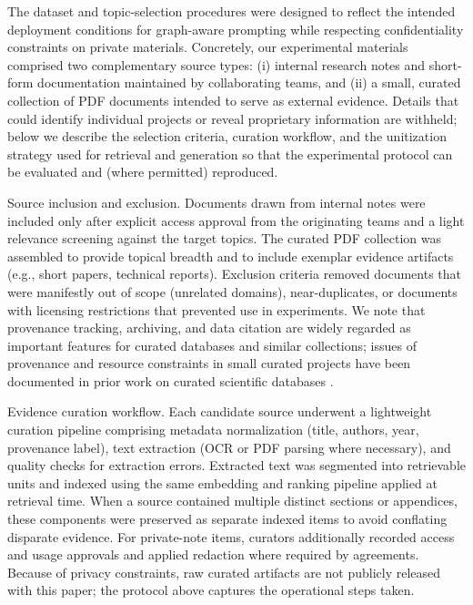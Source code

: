 The dataset and topic-selection procedures were designed to reflect the intended deployment conditions for graph-aware prompting while respecting confidentiality constraints on private materials. Concretely, our experimental materials comprised two complementary source types: (i) internal research notes and short-form documentation maintained by collaborating teams, and (ii) a small, curated collection of PDF documents intended to serve as external evidence. Details that could identify individual projects or reveal proprietary information are withheld; below we describe the selection criteria, curation workflow, and the unitization strategy used for retrieval and generation so that the experimental protocol can be evaluated and (where permitted) reproduced.

Source inclusion and exclusion. Documents drawn from internal notes were included only after explicit access approval from the originating teams and a light relevance screening against the target topics. The curated PDF collection was assembled to provide topical breadth and to include exemplar evidence artifacts (e.g., short papers, technical reports). Exclusion criteria removed documents that were manifestly out of scope (unrelated domains), near-duplicates, or documents with licensing restrictions that prevented use in experiments. We note that provenance tracking, archiving, and data citation are widely regarded as important features for curated databases and similar collections; issues of provenance and resource constraints in small curated projects have been documented in prior work on curated scientific databases \cite{web_fowler_2020_cross_tier_web_programming_for_curated_databases}.

Evidence curation workflow. Each candidate source underwent a lightweight curation pipeline comprising metadata normalization (title, authors, year, provenance label), text extraction (OCR or PDF parsing where necessary), and quality checks for extraction errors. Extracted text was segmented into retrievable units and indexed using the same embedding and ranking pipeline applied at retrieval time. When a source contained multiple distinct sections or appendices, these components were preserved as separate indexed items to avoid conflating disparate evidence. For private-note items, curators additionally recorded access and usage approvals and applied redaction where required by agreements. Because of privacy constraints, raw curated artifacts are not publicly released with this paper; the protocol above captures the operational steps taken.


